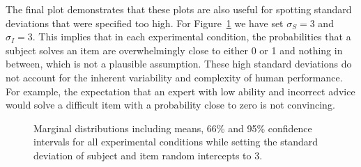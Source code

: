 \documentclass[
  man,
  floatsintext,
  longtable,
  a4paper,
  nolmodern,
  notxfonts,
  notimes,
  colorlinks=true,linkcolor=blue,citecolor=blue,urlcolor=blue]{apa7}
\begin{document}
The final plot demonstrates that these plots are also useful for
spotting standard deviations that were specified too high. For
Figure~\ref{fig-margdist3} we have set \(\sigma_S = 3\) and
\(\sigma_I = 3\). This implies that in each experimental condition, the
probabilities that a subject solves an item are overwhelmingly close to
either 0 or 1 and nothing in between, which is not a plausible
assumption. These high standard deviations do not account for the
inherent variability and complexity of human performance. For example,
the expectation that an expert with low ability and incorrect advice
would solve a difficult item with a probability close to zero is not
convincing.

\label{cell-fig-margdist3}
\begin{figure}[H]

\caption{\label{fig-margdist3}Marginal distributions including means,
66\% and 95\% confidence intervals for all experimental conditions while
setting the standard deviation of subject and item random intercepts to
3.}


\end{figure}%
\end{document}
